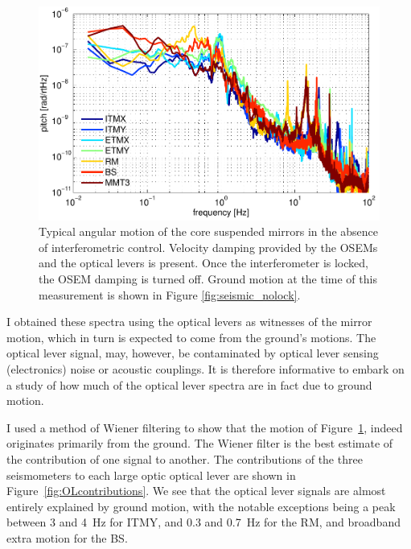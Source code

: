 \begin{figure}
\begin{centering}
\includegraphics[width=1.0\columnwidth]{figures/seismic_mirrormotion.pdf}
\caption[Typical angular motion of the core suspended mirrors in the
  absence of interferometric control]{Typical angular motion of the core suspended mirrors in the 
  absence of interferometric control. Velocity damping provided by the
  OSEMs and the optical levers is present. Once the interferometer is locked, the OSEM damping is turned off. Ground motion at the time of this measurement is shown in Figure \ref{fig:seismic_nolock}.}
\label{fig:seismicMirror}
\end{centering}
\end{figure}


I obtained these spectra using the optical levers as witnesses of the mirror motion, which in turn is expected to come from the ground's motions. The optical lever signal, may, however, be contaminated by optical lever sensing (electronics) noise or acoustic couplings. It is therefore informative to embark on a study of how much of the optical lever spectra are in fact due to ground motion. 

I used a method of Wiener filtering \cite{Wiener1975Extrapolation} to show that the motion of Figure~\ref{fig:seismicMirror}, indeed originates primarily from the ground. The Wiener filter is the best estimate of the contribution of one signal to another. The contributions of the three seismometers to each large optic optical lever are shown in Figure~\ref{fig:OLcontributions}. We see that the optical lever signals are almost entirely explained by ground motion, with the notable exceptions being a peak between 3 and 4~Hz for ITMY, and 0.3 and 0.7~Hz for the RM, and broadband extra motion for the BS.

